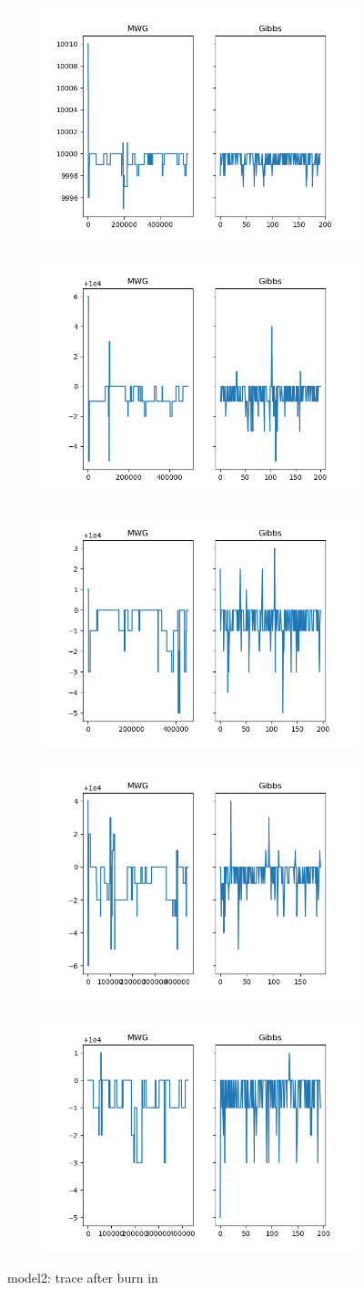 \begin{figure}[h]
    \centering
    \begin{subfigure}
    	\centering
        \includegraphics[width=0.3\linewidth]{../../plots/Trace_post_burnin_M2_N20000_NMCMC3_seed0_diffind2.png}
    \end{subfigure}
    \begin{subfigure}
        \centering
    	\includegraphics[width=0.3\linewidth]{../../plots/Trace_post_burnin_M2_N20000_NMCMC3_seed1_diffind2.png}
	\end{subfigure}
	\begin{subfigure}
	    \centering
    	\includegraphics[width=0.3\linewidth]{../../plots/Trace_post_burnin_M2_N20000_NMCMC3_seed2_diffind2.png}
	\end{subfigure}
	\begin{subfigure}
	    \centering
    	\includegraphics[width=0.3\linewidth]{../../plots/Trace_post_burnin_M2_N20000_NMCMC3_seed3_diffind2.png}
	\end{subfigure}
	\begin{subfigure}
	    \centering
    	\includegraphics[width=0.3\linewidth]{../../plots/Trace_post_burnin_M2_N20000_NMCMC3_seed4_diffind2.png}
	\end{subfigure}
	\caption{model2: trace after burn in}
\end{figure}

